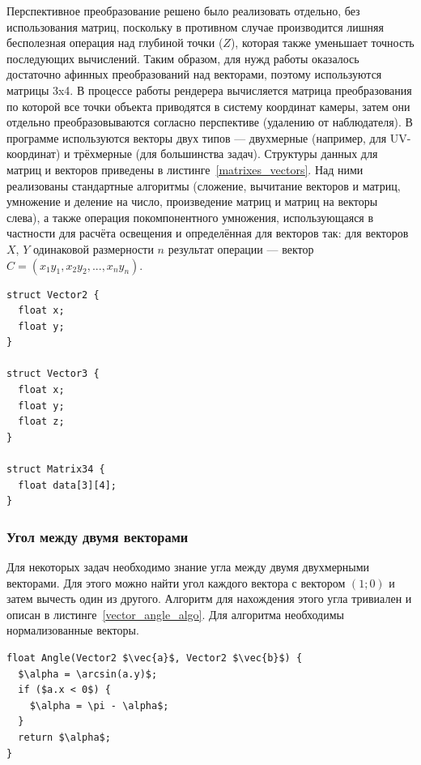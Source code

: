 \documentclass[a4paper,12pt]{report}
\numberwithin{equation}{section}
\begin{document}
Перспективное преобразование решено было реализовать отдельно, без использования матриц, поскольку в противном случае производится лишняя бесполезная операция над глубиной точки ($Z$), которая также уменьшает точность последующих вычислений. Таким образом, для нужд работы оказалось достаточно афинных преобразований над векторами, поэтому используются матрицы 3x4. В процессе работы рендерера вычисляется матрица преобразования по которой все точки объекта приводятся в систему координат камеры, затем они отдельно преобразовываются согласно перспективе (удалению от наблюдателя). В программе используются векторы двух типов --- двухмерные (например, для UV-координат) и трёхмерные (для большинства задач). Структуры данных для матриц и векторов приведены в листинге~\ref{matrixes_vectors}. Над ними реализованы стандартные алгоритмы (сложение, вычитание векторов и матриц, умножение и деление на число, произведение матриц и матриц на векторы слева), а также операция покомпонентного умножения, использующаяся в частности для расчёта освещения и определённая для векторов так: для векторов $X$, $Y$ одинаковой размерности $n$ результат операции --- вектор $C = (x_1 y_1, x_2 y_2, ..., x_n y_n)$.

\begin{lstlisting}[float=h,caption={Структуры данных ``Вектор'' и ``Матрица''},label=matrixes_vectors]
struct Vector2 {
  float x;
  float y;
}

struct Vector3 {
  float x;
  float y;
  float z;
}

struct Matrix34 {
  float data[3][4];
}
\end{lstlisting}

\subsubsection{Угол между двумя векторами}
Для некоторых задач необходимо знание угла между двумя двухмерными векторами. Для этого можно найти угол каждого вектора с вектором $(1; 0)$ и затем вычесть один из другого. Алгоритм для нахождения этого угла тривиален и описан в листинге~\ref{vector_angle_algo}. Для алгоритма необходимы нормализованные векторы.

\begin{lstlisting}[float=h!,caption={Угол между вектором и $(1; 0)$},label=vector_angle_algo]
float Angle(Vector2 $\vec{a}$, Vector2 $\vec{b}$) {
  $\alpha = \arcsin(a.y)$;
  if ($a.x < 0$) {
    $\alpha = \pi - \alpha$;
  }
  return $\alpha$;
}
\end{lstlisting}
\end{document}
